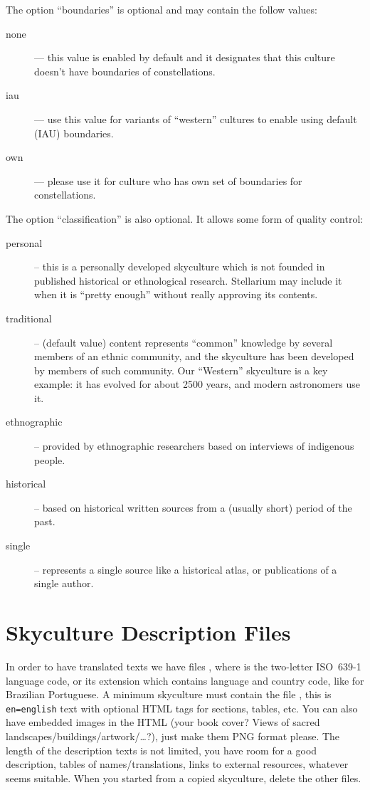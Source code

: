 The option ``boundaries'' is optional and may contain the follow values:
\begin{description}
\item[none] --- this value is enabled by default and it designates that this culture doesn't have boundaries of constellations.
\item[iau] --- use this value for variants of ``western'' cultures to enable using default (IAU) boundaries.
\item[own] --- please use it for culture who has own set of boundaries for constellations.
\end{description}

The option ``classification'' is also optional.  It allows some form of quality control:
\begin{description}
  \item[personal] -- this is a personally developed skyculture which
    is not founded in published historical or ethnological research. Stellarium
    may include it when it is ``pretty enough'' without really
    approving its contents.
  \item[traditional] -- (default value) content represents ``common'' knowledge by
    several members of an ethnic community, and the skyculture has
    been developed by members of such community. Our ``Western''
    skyculture is a key example: it has evolved for about 2500 years,
    and modern astronomers use it.
  \item[ethnographic] -- provided by ethnographic researchers based on
    interviews of indigenous people.
  \item[historical] -- based on historical written sources from a
    (usually short) period of the past.
  \item[single] -- represents a single source like a historical atlas,
    or publications of a single author.
\end{description}


\section{Skyculture Description Files}
\label{sec:skycultures:description}


In order to have translated texts we have files
, where  is the two-letter
ISO~639-1 language code, or its extension which contains language and
country code, like  for Brazilian Portuguese. A minimum
skyculture must contain the file , this is
\texttt{en=english} text with optional HTML tags for sections, tables,
etc. You can also have embedded images in the HTML (your book cover?
Views of sacred landscapes/buildings/artwork/\ldots?), just make them
PNG format please. The length of the description texts is not limited,
you have room for a good description, tables of names/translations,
links to external resources, whatever seems suitable. When you started
from a copied skyculture, delete the other 
files.

